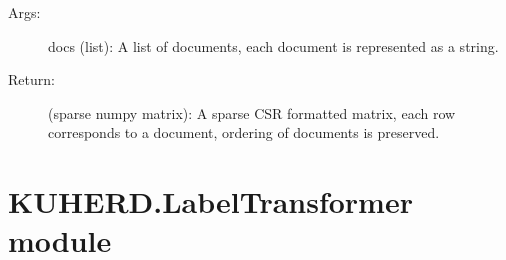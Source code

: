 \documentclass[letterpaper,10pt,english]{sphinxmanual}
\begin{document}
\begin{fulllineitems}
\begin{fulllineitems}
\begin{description}
\item[{Args:}] \leavevmode
docs (list): A list of documents, each document is represented as a string.

\item[{Return:}] \leavevmode
(sparse numpy matrix): A sparse CSR formatted matrix, each row corresponds to a document, ordering of documents is preserved.

\end{description}

\end{fulllineitems}


\end{fulllineitems}


\begin{fulllineitems}
\label{\detokenize{KUHERD:KUHERD.HerdVectorizer.main}}
\end{fulllineitems}



\section{KUHERD.LabelTransformer module}
\label{\detokenize{KUHERD:module-KUHERD.LabelTransformer}}\label{\detokenize{KUHERD:kuherd-labeltransformer-module}}
\end{document}
